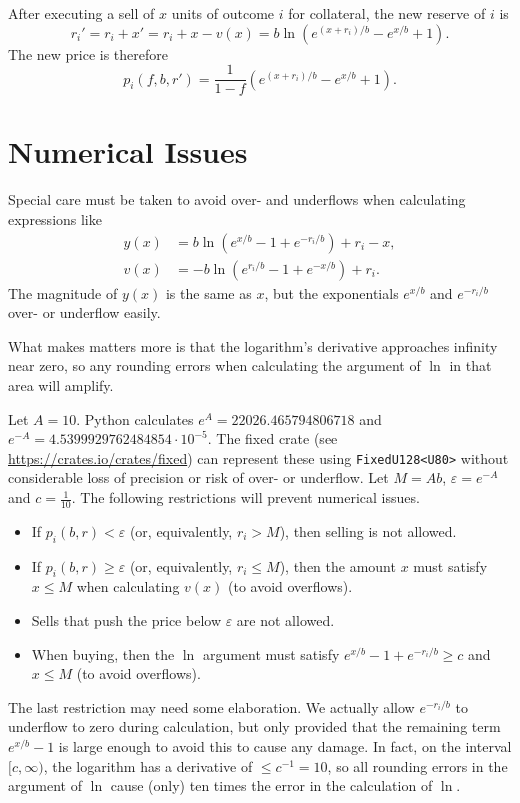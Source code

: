 \documentclass[12pt]{article}
\begin{document}
After executing a sell of $x$ units of outcome $i$ for collateral, the new reserve of $i$ is
\[
    r_i' = r_i + x' = r_i + x - v(x) = b \ln (e^{(x + r_i)/b} - e^{x/b} + 1).
\]
The new price is therefore
\[
    p_i(f, b, r') = \frac{1}{1-f} (e^{(x + r_i)/b} - e^{x/b} + 1).
\]

\section{Numerical Issues}

Special care must be taken to avoid over- and underflows when calculating expressions like
\begin{align*}
    y(x) &= b \ln (e^{x/b} - 1 + e^{-r_i/b}) + r_i - x, \\
    v(x) &= -b \ln (e^{r_i/b} - 1 + e^{-x/b}) + r_i.
\end{align*}
The magnitude of $y(x)$ is the same as $x$, but the exponentials $e^{x/b}$ and $e^{-r_i/b}$ over- or underflow easily.

What makes matters more is that the logarithm's derivative approaches infinity near zero, so any rounding errors when calculating the argument of $\ln$ in that area will amplify.

Let $A = 10$. Python calculates $e^A = 22026.465794806718$ and $e^{-A} = 4.5399929762484854 \cdot 10^{-5}$. The fixed crate (see \url{https://crates.io/crates/fixed}) can represent these using \texttt{FixedU128<U80>} without considerable loss of precision or risk of over- or underflow. Let $M = Ab$, $\varepsilon = e^{-A}$ and $c = \frac{1}{10}$. The following restrictions will prevent numerical issues.

\begin{itemize}
    \item If $p_i(b, r) < \varepsilon$ (or, equivalently, $r_i > M$), then selling is not allowed.
    \item If $p_i(b, r) \geq \varepsilon$ (or, equivalently, $r_i \leq M$), then the amount $x$ must satisfy $x \leq M$ when calculating $v(x)$ (to avoid overflows).
    \item Sells that push the price below $\varepsilon$ are not allowed.
    \item When buying, then the $\ln$ argument must satisfy $e^{x/b} - 1 + e^{-r_i/b} \geq c$ and $x \leq M$ (to avoid overflows).
\end{itemize}

The last restriction may need some elaboration. We actually allow $e^{-r_i/b}$ to underflow to zero during calculation, but only provided that the remaining term $e^{x/b} - 1$ is large enough to avoid this to cause any damage. In fact, on the interval $[c, \infty)$, the logarithm has a derivative of $\leq c^{-1} = 10$, so all rounding errors in the argument of $\ln$ cause (only) ten times the error in the calculation of $\ln$. 
\end{document}
